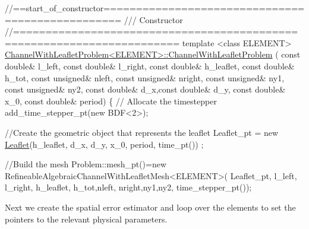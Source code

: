 \begin{DoxyCodeInclude}




\textcolor{comment}{//==start\_of\_constructor=================================================}\textcolor{comment}{}
\textcolor{comment}{/// Constructor}
\textcolor{comment}{}\textcolor{comment}{//=======================================================================}
\textcolor{keyword}{template} <\textcolor{keyword}{class} ELEMENT>
\hyperlink{classChannelWithLeafletProblem_a3c5a4c97ec66fe53bc130005c74a47b5}{ChannelWithLeafletProblem<ELEMENT>::ChannelWithLeafletProblem}
      (
 \textcolor{keyword}{const} \textcolor{keywordtype}{double}& l\_left,
 \textcolor{keyword}{const} \textcolor{keywordtype}{double}& l\_right, \textcolor{keyword}{const} \textcolor{keywordtype}{double}& h\_leaflet,
 \textcolor{keyword}{const} \textcolor{keywordtype}{double}& h\_tot,
 \textcolor{keyword}{const} \textcolor{keywordtype}{unsigned}& nleft, \textcolor{keyword}{const} \textcolor{keywordtype}{unsigned}& nright,
 \textcolor{keyword}{const} \textcolor{keywordtype}{unsigned}& ny1, \textcolor{keyword}{const} \textcolor{keywordtype}{unsigned}&  ny2,
 \textcolor{keyword}{const} \textcolor{keywordtype}{double}& d\_x,\textcolor{keyword}{const} \textcolor{keywordtype}{double}& d\_y,
 \textcolor{keyword}{const} \textcolor{keywordtype}{double}& x\_0, \textcolor{keyword}{const} \textcolor{keywordtype}{double}& period)
\{
 \textcolor{comment}{// Allocate the timestepper}
 add\_time\_stepper\_pt(\textcolor{keyword}{new} BDF<2>);
 
 \textcolor{comment}{//Create the geometric object that represents the leaflet}
 Leaflet\_pt = \textcolor{keyword}{new} \hyperlink{classLeaflet}{Leaflet}(h\_leaflet, d\_x, d\_y, x\_0, period, time\_pt()) ;

\textcolor{comment}{//Build the mesh}
Problem::mesh\_pt()=\textcolor{keyword}{new} RefineableAlgebraicChannelWithLeafletMesh<ELEMENT>(
 Leaflet\_pt,
 l\_left, l\_right,
 h\_leaflet,
 h\_tot,nleft,
 nright,ny1,ny2,
 time\_stepper\_pt());     

\end{DoxyCodeInclude}


Next we create the spatial error estimator and loop over the elements to set the pointers to the relevant physical parameters.


